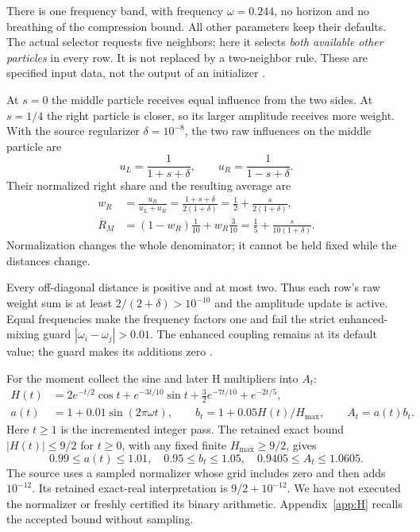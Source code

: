 \documentclass[11pt,a4paper]{article}
\theoremstyle{remark}\newtheorem{remark}[theorem]{Remark}
\newcommand{\Rbar}{\overline R}
\numberwithin{equation}{section}
\begin{document}
There is one frequency band, with frequency $\omega=0.244$, no horizon and
no breathing of the compression bound. All other parameters keep their
defaults. The actual selector requests five neighbors; here it selects
\emph{both available other particles} in every row. It is not replaced by
a two-neighbor rule. These are specified input data, not the output of an
initializer \cite[lines 34, 62--103, 111--127]{T}.

At $s=0$ the middle particle receives equal influence from the two sides.
At $s=1/4$ the right particle is closer, so its larger amplitude receives
more weight. With the source regularizer $\delta=10^{-8}$, the two raw
influences on the middle particle are
\[
u_L=\frac{1}{1+s+\delta},\qquad
u_R=\frac{1}{1-s+\delta}.
\]
Their normalized right share and the resulting average are
\begin{align}
w_R&=\frac{u_R}{u_L+u_R}
=\frac{1+s+\delta}{2(1+\delta)}
=\frac12+\frac{s}{2(1+\delta)},\label{eq:three-weight}\\
\Rbar_M&=(1-w_R)\frac1{10}+w_R\frac3{10}
=\frac15+\frac{s}{10(1+\delta)}.\label{eq:three-mean}
\end{align}
Normalization changes the whole denominator; it cannot be held fixed while
the distances change.

Every off-diagonal distance is positive and at most two. Thus each row's
raw weight sum is at least $2/(2+\delta)>10^{-10}$ and the amplitude update
is active. Equal frequencies make the frequency factors one and fail the
strict enhanced-mixing guard $|\omega_i-\omega_j|>0.01$.
The enhanced coupling remains at its default value; the guard makes its
additions zero \cite[lines 156--188]{T}.

For the moment collect the sine and later H multipliers into $A_t$:
\begin{align}
H(t)&=2e^{-t/2}\cos t+e^{-3t/10}\sin t
       +\tfrac32e^{-7t/10}+e^{-2t/5},\label{eq:H}\\
a(t)&=1+0.01\sin(2\pi\omega t),\qquad
b_t=1+0.05H(t)/H_{\max},\qquad A_t=a(t)b_t.\label{eq:gains}
\end{align}
Here $t\ge1$ is the incremented integer pass. The retained exact bound
$|H(t)|\le9/2$ for $t\ge0$, with any fixed finite $H_{\max}\ge9/2$, gives
\begin{equation}
0.99\le a(t)\le1.01,\quad 0.95\le b_t\le1.05,\quad
0.9405\le A_t\le1.0605.\label{eq:gain-bounds}
\end{equation}
The source uses a sampled normalizer whose grid includes zero and then adds
$10^{-12}$. Its retained exact-real interpretation is $9/2+10^{-12}$.
We have not executed the normalizer or freshly certified its binary arithmetic.
Appendix~\ref{app:H} recalls the accepted bound without sampling.
\end{document}
